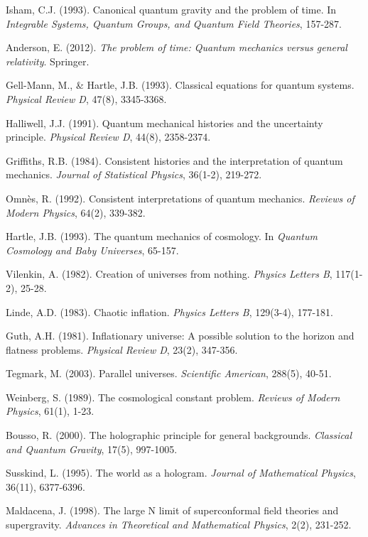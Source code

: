\documentclass[12pt]{article}
\begin{document}
\begin{thebibliography}{99}
Isham, C.J. (1993). Canonical quantum gravity and the problem of time. In \emph{Integrable Systems, Quantum Groups, and Quantum Field Theories}, 157-287.

Anderson, E. (2012). \emph{The problem of time: Quantum mechanics versus general relativity}. Springer.

Gell-Mann, M., \& Hartle, J.B. (1993). Classical equations for quantum systems. \emph{Physical Review D}, 47(8), 3345-3368.

Halliwell, J.J. (1991). Quantum mechanical histories and the uncertainty principle. \emph{Physical Review D}, 44(8), 2358-2374.

Griffiths, R.B. (1984). Consistent histories and the interpretation of quantum mechanics. \emph{Journal of Statistical Physics}, 36(1-2), 219-272.

Omnès, R. (1992). Consistent interpretations of quantum mechanics. \emph{Reviews of Modern Physics}, 64(2), 339-382.

Hartle, J.B. (1993). The quantum mechanics of cosmology. In \emph{Quantum Cosmology and Baby Universes}, 65-157.

Vilenkin, A. (1982). Creation of universes from nothing. \emph{Physics Letters B}, 117(1-2), 25-28.

Linde, A.D. (1983). Chaotic inflation. \emph{Physics Letters B}, 129(3-4), 177-181.

Guth, A.H. (1981). Inflationary universe: A possible solution to the horizon and flatness problems. \emph{Physical Review D}, 23(2), 347-356.

Tegmark, M. (2003). Parallel universes. \emph{Scientific American}, 288(5), 40-51.

Weinberg, S. (1989). The cosmological constant problem. \emph{Reviews of Modern Physics}, 61(1), 1-23.

Bousso, R. (2000). The holographic principle for general backgrounds. \emph{Classical and Quantum Gravity}, 17(5), 997-1005.

Susskind, L. (1995). The world as a hologram. \emph{Journal of Mathematical Physics}, 36(11), 6377-6396.

Maldacena, J. (1998). The large N limit of superconformal field theories and supergravity. \emph{Advances in Theoretical and Mathematical Physics}, 2(2), 231-252.

\end{thebibliography}
\end{document}
